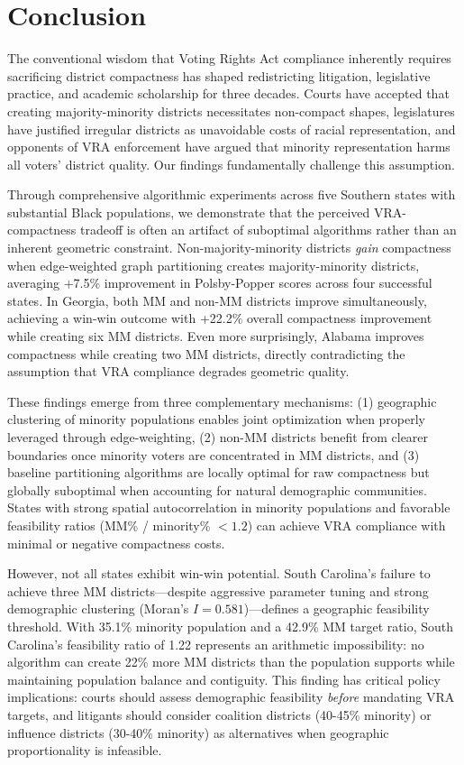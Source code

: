 
\section{Conclusion}

The conventional wisdom that Voting Rights Act compliance inherently requires sacrificing district compactness has shaped redistricting litigation, legislative practice, and academic scholarship for three decades. Courts have accepted that creating majority-minority districts necessitates non-compact shapes, legislatures have justified irregular districts as unavoidable costs of racial representation, and opponents of VRA enforcement have argued that minority representation harms all voters' district quality. Our findings fundamentally challenge this assumption.

Through comprehensive algorithmic experiments across five Southern states with substantial Black populations, we demonstrate that the perceived VRA-compactness tradeoff is often an artifact of suboptimal algorithms rather than an inherent geometric constraint. Non-majority-minority districts \emph{gain} compactness when edge-weighted graph partitioning creates majority-minority districts, averaging +7.5\% improvement in Polsby-Popper scores across four successful states. In Georgia, both MM and non-MM districts improve simultaneously, achieving a win-win outcome with +22.2\% overall compactness improvement while creating six MM districts. Even more surprisingly, Alabama improves compactness while creating two MM districts, directly contradicting the assumption that VRA compliance degrades geometric quality.

These findings emerge from three complementary mechanisms: (1) geographic clustering of minority populations enables joint optimization when properly leveraged through edge-weighting, (2) non-MM districts benefit from clearer boundaries once minority voters are concentrated in MM districts, and (3) baseline partitioning algorithms are locally optimal for raw compactness but globally suboptimal when accounting for natural demographic communities. States with strong spatial autocorrelation in minority populations and favorable feasibility ratios (MM\% / minority\% $< 1.2$) can achieve VRA compliance with minimal or negative compactness costs.

However, not all states exhibit win-win potential. South Carolina's failure to achieve three MM districts---despite aggressive parameter tuning and strong demographic clustering (Moran's $I = 0.581$)---defines a geographic feasibility threshold. With 35.1\% minority population and a 42.9\% MM target ratio, South Carolina's feasibility ratio of 1.22 represents an arithmetic impossibility: no algorithm can create 22\% more MM districts than the population supports while maintaining population balance and contiguity. This finding has critical policy implications: courts should assess demographic feasibility \emph{before} mandating VRA targets, and litigants should consider coalition districts (40-45\% minority) or influence districts (30-40\% minority) as alternatives when geographic proportionality is infeasible.


